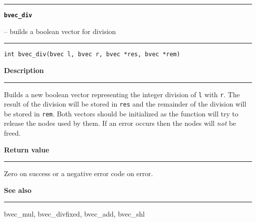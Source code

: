 \vspace{8ex}
\begin{minipage}{\textwidth}

\noindent\begin{minipage}{\textwidth}
\rule{\textwidth}{0.5mm}
{\tt\bf bvec\_div }
\--- builds a boolean vector for division  \hspace{\fill}
\\\rule[1.5ex]{\textwidth}{0.5mm}
\end{minipage}

\noindent\begin{verbatim}
int bvec_div(bvec l, bvec r, bvec *res, bvec *rem) 
\end{verbatim}

\vspace{\parsep}\noindent
{\bf Description}\\\rule[1.5ex]{\textwidth}{0.2mm}\vspace{-1.5ex}\setlength{\parindent}{1em}
Builds a new boolean vector representing the integer division
           of {\tt l} with {\tt r}. The result of the division will be stored
	   in {\tt res} and the remainder of the division will be stored in
	   {\tt rem}. Both vectors should be initialized as the function
	   will try to release the nodes used by them. If an error occurs then
	   the nodes will {\em not} be freed.

\setlength{\parindent}{0em}\vspace{\parsep}\vspace{\baselineskip}\noindent
{\bf Return value}\\\rule[1.5ex]{\textwidth}{0.2mm}\vspace{-1.5ex}
Zero on success or a negative error code on error. 

\vspace{\parsep}\vspace{\baselineskip}\noindent
{\bf See also}\\\rule[1.5ex]{\textwidth}{0.2mm}\vspace{-1.5ex}
bvec\_mul, bvec\_divfixed, bvec\_add, bvec\_shl 
\end{minipage}
\vspace{8ex}
